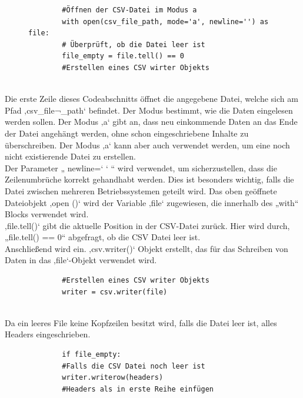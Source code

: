 \vspace{3mm}
\begin{figure}[H]
	\centering
	\begin{verbatim}
		#Öffnen der CSV-Datei im Modus a
		with open(csv_file_path, mode='a', newline='') as file:
		# Überprüft, ob die Datei leer ist
		file_empty = file.tell() == 0
		#Erstellen eines CSV wirter Objekts
		
	\end{verbatim}
\end{figure}
Die erste Zeile dieses Codeabschnitts öffnet die angegebene Datei, welche sich am Pfad ‚csv\_file¬\_path‘ befindet. Der Modus bestimmt, wie die Daten eingelesen werden sollen. Der Modus ‚a‘ gibt an, dass neu einkommende Daten an das Ende der Datei angehängt werden, ohne schon eingeschriebene Inhalte zu überschreiben. Der Modus ‚a‘ kann aber auch verwendet werden, um eine noch nicht existierende Datei zu erstellen. \\
\vspace{3mm}
Der Parameter „ newline=‘ ‘ “ wird verwendet, um sicherzustellen, dass die Zeilenumbrüche korrekt gehandhabt werden. Dies ist besonders wichtig, falls die Datei zwischen mehreren Betriebssystemen geteilt wird. Das oben geöffnete Dateiobjekt ‚open ()‘ wird der Variable ‚file‘ zugewiesen, die innerhalb des „with“ Blocks verwendet wird.\\
\vspace{3mm}
‚file.tell()‘ gibt die aktuelle Position in der CSV-Datei zurück. Hier wird durch, „file.tell() == 0“ abgefragt, ob die CSV Datei leer ist.\\
\vspace{3mm}
Anschließend wird ein. ‚csv.writer()‘ Objekt erstellt, das für das Schreiben von Daten in das ‚file‘-Objekt verwendet wird.
\vspace{3mm}
\begin{figure}[H]
	\centering
	\begin{verbatim}
		#Erstellen eines CSV writer Objekts
		writer = csv.writer(file)
		
	\end{verbatim}
\end{figure}
Da ein leeres File keine Kopfzeilen besitzt wird, falls die Datei leer ist, alles Headers eingeschrieben.
\vspace{3mm} 
\begin{figure}[H]
	\centering
	\begin{verbatim}
		if file_empty: 
		#Falls die CSV Datei noch leer ist
		writer.writerow(headers) 
		#Headers als in erste Reihe einfügen
	\end{verbatim}
\end{figure}
